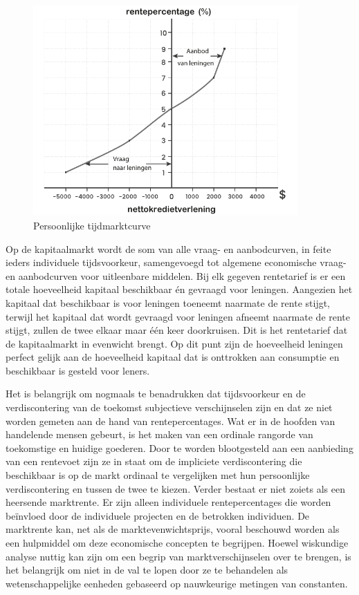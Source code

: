 \begin{figure}
\centering
    \includegraphics[width=0.9\textwidth]{figures/fig29.pdf}
    \caption[Persoonlijke tijdmarktcurve]{Persoonlijke tijdmarktcurve}
    \label{fig29}
\end{figure}

Op de kapitaalmarkt wordt de som van alle vraag- en aanbodcurven, in feite ieders individuele tijdsvoorkeur, samengevoegd tot algemene economische vraag- en aanbodcurven voor uitleenbare middelen. Bij elk gegeven rentetarief is er een totale hoeveelheid kapitaal beschikbaar én gevraagd voor leningen. Aangezien het kapitaal dat beschikbaar is voor leningen toeneemt naarmate de rente stijgt, terwijl het kapitaal dat wordt gevraagd voor leningen afneemt naarmate de rente stijgt, zullen de twee elkaar maar één keer doorkruisen. Dit is het rentetarief dat de kapitaalmarkt in evenwicht brengt. Op dit punt zijn de hoeveelheid leningen perfect gelijk aan de hoeveelheid kapitaal dat is onttrokken aan consumptie en beschikbaar is gesteld voor leners.

Het is belangrijk om nogmaals te benadrukken dat tijdsvoorkeur en de verdiscontering van de toekomst subjectieve verschijnselen zijn en dat ze niet worden gemeten aan de hand van rentepercentages. Wat er in de hoofden van handelende mensen gebeurt, is het maken van een ordinale rangorde van toekomstige en huidige goederen. Door te worden blootgesteld aan een aanbieding van een rentevoet zijn ze in staat om de impliciete verdiscontering die beschikbaar is op de markt ordinaal te vergelijken met hun persoonlijke verdiscontering en tussen de twee te kiezen. Verder bestaat er niet zoiets als een heersende marktrente. Er zijn alleen individuele rentepercentages die worden beïnvloed door de individuele projecten en de betrokken individuen. De marktrente kan, net als de marktevenwichtsprijs, vooral beschouwd worden als een hulpmiddel om deze economische concepten te begrijpen. Hoewel wiskundige analyse nuttig kan zijn om een begrip van marktverschijnselen over te brengen, is het belangrijk om niet in de val te lopen door ze te behandelen als wetenschappelijke eenheden gebaseerd op nauwkeurige metingen van constanten.

